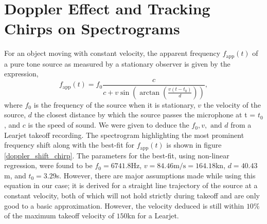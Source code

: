 \documentclass[10pt]{article}
\begin{document}
\section{Doppler Effect and Tracking Chirps on Spectrograms}
For an object moving with constant velocity, the apparent frequency $f_\text{app}(t)$ of a pure tone source as measured by a stationary observer is given by the expression,
\[
f_\text{app}(t) = f_0 \frac{c}{c + v\sin\left(\arctan\left(\frac{v(t-t_0)}{d}\right)\right)},
\]
where $f_0$ is the frequency of the source when it is stationary, $v$ the velocity of the source, $d$ the closest distance by which the source passes the microphone at t = $t_0$, and $c$ is the speed of sound. We were given to deduce the $f_0, v, \text{ and } d$ from a Learjet takeoff recording. The spectrogram highlighting the most prominent frequency shift along with the best-fit for $f_\text{app}(t)$ is shown in figure \ref{doppler_shift_chirp}. The parameters for the best-fit, using non-linear regression, were found to be $f_0 = 6741.8$Hz, $v = 84.46\text{m/s} = 164.18$kn, $d=40.43$m, and $t_0 = 3.29$s. However, there are major assumptions made while using this equation in our case; it is derived for a straight line trajectory of the source at a constant velocity, both of which will not hold strictly during takeoff and are only good to a basic approximation. However, the velocity deduced is still within $10\%$ of the maximum takeoff velocity of $150$kn for a Learjet.
\end{document}

